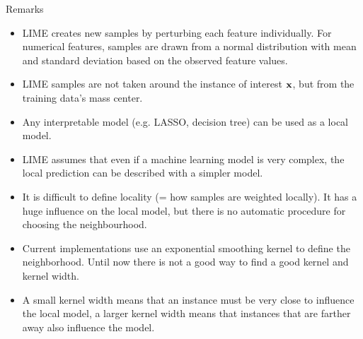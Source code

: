 \documentclass[11pt,compress,t,notes=noshow, xcolor=table]{beamer}
\begin{document}
\begin{vbframe}{Remarks}
  \begin{itemize}
      \item LIME creates new samples by perturbing each feature individually. For numerical features, samples are drawn from a normal distribution with mean and standard deviation based on the observed feature values.   
      \item LIME samples are not taken around the instance of interest $\xv$, but from the training data's mass center.
      \item Any interpretable model (e.g. LASSO, decision tree) can be used as a local model. 
      \item LIME assumes that even if a machine learning model is very complex, the local prediction can be described with a simpler model.
     \item It is difficult to define locality (= how samples are weighted locally). It has a huge influence on the local model, but there is no automatic procedure for choosing the neighbourhood. 
     \item Current implementations use an exponential smoothing kernel to define the neighborhood. 
     Until now there is not a good way to find a good kernel and kernel width. 
     \item A small kernel width means that an instance must be very close to influence the local model, a larger kernel width means that instances that are farther away also influence the model. 
   \end{itemize}
\end{vbframe}
\end{document}
